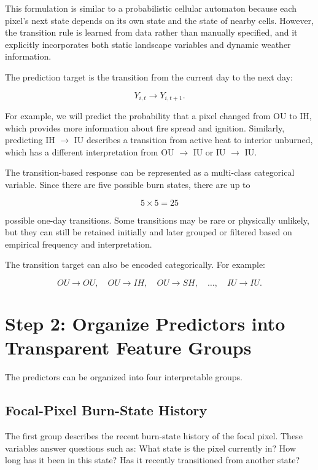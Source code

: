 \documentclass[11pt]{article}
\begin{document}
This formulation is similar to a probabilistic cellular automaton because each pixel's next state depends on its own state and the state of nearby cells. However, the transition rule is learned from data rather than manually specified, and it explicitly incorporates both static landscape variables and dynamic weather information.

The prediction target is the transition from the current day to the next day:

\[
Y_{i,t} \rightarrow Y_{i,t+1}.
\]

For example, we will predict the probability that a pixel changed from OU to IH, which provides more information about fire spread and ignition. Similarly, predicting IH $\rightarrow$ IU describes a transition from active heat to interior unburned, which has a different interpretation from OU $\rightarrow$ IU or IU $\rightarrow$ IU.

The transition-based response can be represented as a multi-class categorical variable. Since there are five possible burn states, there are up to

\[
5 \times 5 = 25
\]

possible one-day transitions. Some transitions may be rare or physically unlikely, but they can still be retained initially and later grouped or filtered based on empirical frequency and interpretation.

The transition target can also be encoded categorically. For example:

\[
OU \rightarrow OU, \quad
OU \rightarrow IH, \quad
OU \rightarrow SH, \quad
\ldots, \quad
IU \rightarrow IU.
\]

\section{Step 2: Organize Predictors into Transparent Feature Groups}

The predictors can be organized into four interpretable groups.

\subsection*{Focal-Pixel Burn-State History}

The first group describes the recent burn-state history of the focal pixel. These variables answer questions such as: What state is the pixel currently in? How long has it been in this state? Has it recently transitioned from another state?
\end{document}
